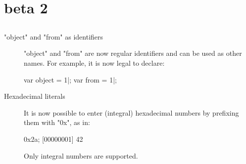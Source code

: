 \section{ beta 2}

\subsection{\us}

\begin{description}
\item["object" and "from" as identifiers]

"object" and "from" are now regular identifiers and can be used as
other names.  For example, it is now legal to declare:

\begin{urbiscript}
var object = 1|;
var from = 1|;
\end{urbiscript}

\item[Hexadecimal literals]
  It is now possible to enter (integral) hexadecimal numbers by
  prefixing them with "0x", as in:

\begin{urbiscript}
0x2a;
[00000001] 42
\end{urbiscript}

Only integral numbers are supported.

\end{description}

